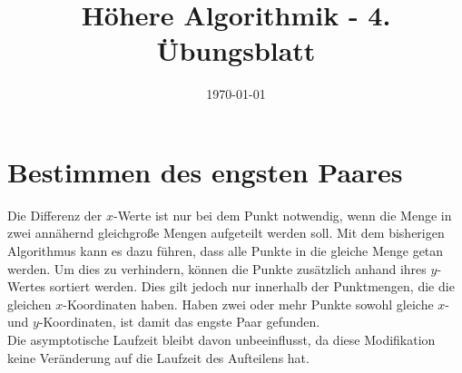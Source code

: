 \documentclass[a4paper,10pt]{scrartcl}
\title{H\"ohere Algorithmik - 4. \"Ubungsblatt}
\author{\Authors}
\date{\today}
\begin{document}
\maketitle

\section{Bestimmen des engsten Paares}
Die Differenz der $x$-Werte ist nur bei dem Punkt notwendig, wenn die Menge in zwei annähernd gleichgroße Mengen aufgeteilt werden soll. Mit dem bisherigen Algorithmus kann es dazu führen, dass alle Punkte in die gleiche Menge getan werden. Um dies zu verhindern, können die Punkte zusätzlich anhand ihres $y$-Wertes sortiert werden. Dies gilt jedoch nur innerhalb der Punktmengen, die die gleichen $x$-Koordinaten haben. Haben zwei oder mehr Punkte sowohl gleiche $x$- und $y$-Koordinaten, ist damit das engste Paar gefunden.\\
Die asymptotische Laufzeit bleibt davon unbeeinflusst, da diese Modifikation keine Veränderung auf die Laufzeit des Aufteilens hat.
\end{document}
